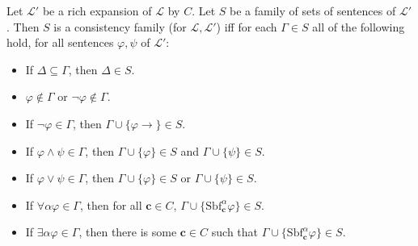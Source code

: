 Let $\mathcal{L}'$ be a rich expansion of $\mathcal{L}$ by $C$. Let $S$ be a family of sets of sentences of $\mathcal{L}'$. Then $S$ is a consistency family (for $\mathcal{L}, \mathcal{L}'$) iff for each $\Gamma \in S$ all of the following hold, for all sentences $\varphi, \psi$ of $\mathcal{L}'$:

\begin{itemize}
\item[(C0)] If $\Delta \subseteq \Gamma$, then $\Delta \in S$.
\item[(C1)] $\varphi \notin \Gamma$ or $\neg \varphi \notin \Gamma$.
\item[(C2)] If $\neg \varphi \in \Gamma$, then $\Gamma \cup \{\varphi \rightarrow\} \in S$.
\item[(C3)] If $\varphi \land \psi \in \Gamma$, then $\Gamma \cup \{\varphi\} \in S$ and $\Gamma \cup \{\psi\} \in S$.
\item[(C4)] If $\varphi \lor \psi \in \Gamma$, then $\Gamma \cup \{\varphi\} \in S$ or $\Gamma \cup \{\psi\} \in S$.
\item[(C5)] If $\forall \alpha \varphi \in \Gamma$, then for all $\mathbf{c} \in C$, $\Gamma \cup \{\text{Sbf}_{\mathbf{c}}^\alpha \varphi\} \in S$.
\item[(C6)] If $\exists \alpha \varphi \in \Gamma$, then there is some $\mathbf{c} \in C$ such that $\Gamma \cup \{\text{Sbf}_{\mathbf{c}}^\alpha \varphi\} \in S$.
\end{itemize}

